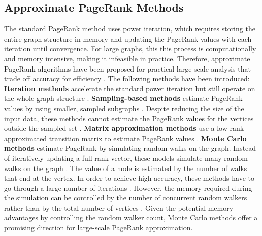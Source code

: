 \subsection{Approximate PageRank Methods}

The standard PageRank method uses power iteration, which requires storing the entire graph structure in memory and updating the PageRank values with each iteration until convergence. For large graphs, this this process is computationally and memory intensive, making it infeasible in practice. Therefore, approximate PageRank algorithms have been proposed for practical large-scale analysis that trade off accuracy for efficiency \cite{wu_efficient_2024}. The following methods have been introduced:
\textbf{Iteration methods} \cite{xie_parameterized_2023-1}\cite{anikin_efficient_2022} accelerate the standard power iteration but still operate on the whole graph structure \cite{wu_efficient_2024}. 
\textbf{Sampling-based methods} estimate PageRank values by using smaller, sampled subgraphs \cite{bar-yossef_local_2008}\cite{chen_local_2004}. Despite reducing the size of the input data, these methods cannot estimate the PageRank values for the vertices outside the sampled set \cite{wu_efficient_2024}.
\textbf{Matrix approximation methods} use a low-rank approximated transition matrix to estimate PageRank values \cite{liu_fast_2015}\cite{benczur_feasibility_2005}. 
\textbf{Monte Carlo methods} estimate PageRank by simulating random walks on the graph. Instead of iteratively updating a full rank vector, these models simulate many random walks on the graph \cite{avrachenkov_monte_2007}. The value of a node is estimated by the number of walks that end at the vertex. In order to achieve high accuracy, these methods have to go through a large number of iterations \cite{wu_efficient_2024}. However, the memory required during the simulation can be controlled by the number of concurrent random walkers rather than by the total number of vertices \cite{avrachenkov_monte_2007}. Given the potential memory advantages by controlling the random walker count, Monte Carlo methods offer a promising direction for large-scale PageRank approximation.